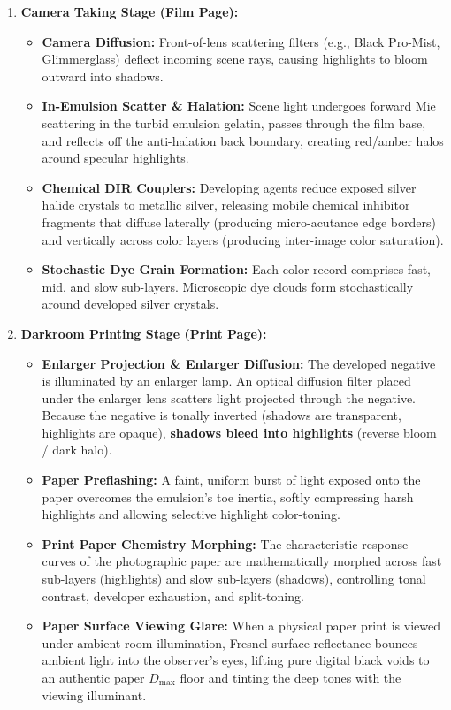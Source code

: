 \documentclass[11pt,a4paper]{article}
\begin{document}
\begin{enumerate}[leftmargin=*]
    \item \textbf{Camera Taking Stage (Film Page):}
    \begin{itemize}
        \item \textbf{Camera Diffusion:} Front-of-lens scattering filters (e.g., Black Pro-Mist, Glimmerglass) deflect incoming scene rays, causing highlights to bloom outward into shadows.
        \item \textbf{In-Emulsion Scatter \& Halation:} Scene light undergoes forward Mie scattering in the turbid emulsion gelatin, passes through the film base, and reflects off the anti-halation back boundary, creating red/amber halos around specular highlights.
        \item \textbf{Chemical DIR Couplers:} Developing agents reduce exposed silver halide crystals to metallic silver, releasing mobile chemical inhibitor fragments that diffuse laterally (producing micro-acutance edge borders) and vertically across color layers (producing inter-image color saturation).
        \item \textbf{Stochastic Dye Grain Formation:} Each color record comprises fast, mid, and slow sub-layers. Microscopic dye clouds form stochastically around developed silver crystals.
    \end{itemize}

    \item \textbf{Darkroom Printing Stage (Print Page):}
    \begin{itemize}
        \item \textbf{Enlarger Projection \& Enlarger Diffusion:} The developed negative is illuminated by an enlarger lamp. An optical diffusion filter placed under the enlarger lens scatters light projected through the negative. Because the negative is tonally inverted (shadows are transparent, highlights are opaque), \textbf{shadows bleed into highlights} (reverse bloom / dark halo).
        \item \textbf{Paper Preflashing:} A faint, uniform burst of light exposed onto the paper overcomes the emulsion's toe inertia, softly compressing harsh highlights and allowing selective highlight color-toning.
        \item \textbf{Print Paper Chemistry Morphing:} The characteristic response curves of the photographic paper are mathematically morphed across fast sub-layers (highlights) and slow sub-layers (shadows), controlling tonal contrast, developer exhaustion, and split-toning.
        \item \textbf{Paper Surface Viewing Glare:} When a physical paper print is viewed under ambient room illumination, Fresnel surface reflectance bounces ambient light into the observer's eyes, lifting pure digital black voids to an authentic paper $D_{\max}$ floor and tinting the deep tones with the viewing illuminant.
    \end{itemize}


\end{enumerate}
\end{document}
